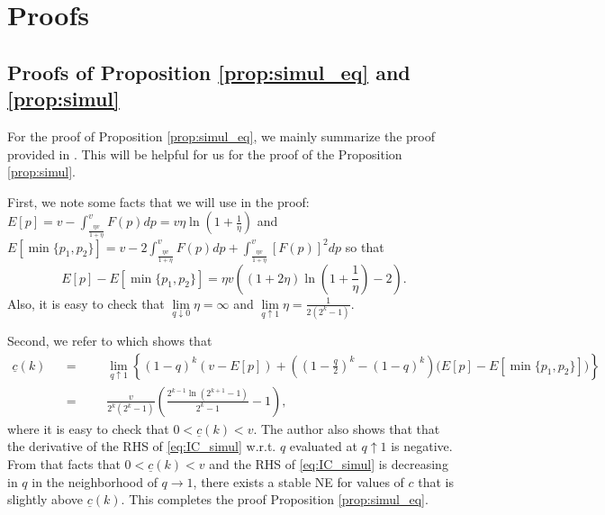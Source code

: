 \documentclass[12pt]{article}
\begin{document}
\pagebreak
\appendix
\setcounter{equation}{0}
\renewcommand{\theequation}{\thesection.\arabic{equation}}



\section{Proofs}




\subsection{Proofs of Proposition \ref{prop:simul_eq} and \ref{prop:simul}}

For the proof of Proposition \ref{prop:simul_eq}, we mainly summarize the proof 
provided in \cite{galeotti2004}.  This will be helpful for us for the proof of 
the Proposition \ref{prop:simul}.  

First, we note some facts that we will use in the proof: $E[p] = 
v - \int_{\frac{\eta v}{1+\eta}}^{v}F(p)dp = v\eta \ln 
\left(1+\frac{1}{\eta}\right)$ and $E[\min\{p_1,p_2\}] = v-2 \int_{\frac{\eta 
v}{1+\eta}}^{v}F(p)dp + \int_{\frac{\eta v}{1+\eta}}^{v}[F(p)]^2dp$ so that 
\begin{equation*}
E[p] - E[\min\{p_1,p_2\}] = \eta v\left((1+2\eta)\ln\left(1 + 
\frac{1}{\eta}\right)-2\right).
\end{equation*}
Also, it is easy to check that $\lim\limits_{q \downarrow 0}\eta = \infty$ and 
$\lim\limits_{q \uparrow 1}\eta =\frac{1}{2(2^k-1)}$.


Second, we refer to \cite{galeotti2004} which shows that
\begin{equation*}
\begin{aligned}
\underline{c}(k) &&=&&& \lim\limits_{q \uparrow 1} \left\{(1-q)^k(v-E[p]) + 
\left(\left(1-\frac{q}{2}\right)^k - (1-q)^k\right)\big(E[p] - 
E[\min\{p_1,p_2\}]\big)\right\}\\
&&=&&& \frac{v}{2^k(2^k-1)}\left(\frac{2^{k-1}\ln\left(2^{k+1} 
-1\right)}{2^k-1}-1\right),
\end{aligned}
\end{equation*}
where it is easy to check that $0<\underline{c}(k)<v$.  The author also shows 
that that the derivative of the RHS of \eqref{eq:IC_simul} w.r.t. $q$ evaluated 
at $q \uparrow 1$ is negative.  From that facts that  $0<\underline{c}(k)<v$ 
and the RHS of \eqref{eq:IC_simul} is decreasing in $q$ in the neighborhood of 
$q \to 1$, there exists a stable NE for values of $c$ that is 
slightly above 
$\underline{c}(k)$.  This completes the proof Proposition \ref{prop:simul_eq}.
\end{document}
